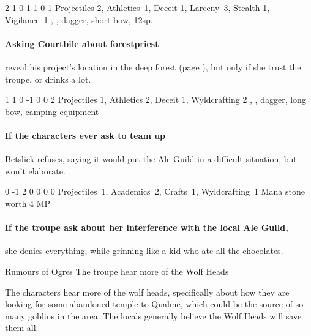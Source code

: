 {2}%
{1}%
{{0}%
{1}%
{1}}%
{0}%
{1}%
{Projectiles 2, Athletics~1, Deceit 1, Larceny~3, Stealth 1, Vigilance~1\knacks{\snapshot, \laststand}}%
{\shortsword, \partialleather, dagger, short bow, 12sp.}%
{\addtocounter{fp}{5}}
\label{courtbile}

\paragraph{Asking Courtbile about \gls{forestpriest}}
reveal his project's location in the deep forest (page \pageref{lostcity}), but only if she trust the troupe, or drinks a lot.

{1}%
{1}%
{{0}%
{-1}%
{0}}%
{0}%
{2}%
{Projectiles 1, Athletics 2, Deceit 1, Wyldcrafting 2\knacks{\adrenalinesurge, \unstoppable, \charge}}%
{\greatsword, \partialchain, dagger, long bow, camping equipment}%
{}

\paragraph{If the characters ever ask to team up}
Betslick refuses, saying it would put the Ale Guild in a difficult situation, but won't elaborate.

{0}%
{-1}%
{{2}%
{0}%
{0}}%
{0}%
{0}%
{Projectiles~1, Academics~2, Crafts~1, Wyldcrafting~1}%
{Mana stone worth 4 MP}%
{
  \knacks{\snapcaster}
  \setcounter{Fire}{2}
  \setcounter{Air}{2}
}

\beardedalemaster
\label{beardedalemaster}

\paragraph{If the troupe ask about her interference with the local Ale Guild,}
she denies everything, while grinning like a kid who ate all the chocolates.

{\N \squash Rumours of Ogres}%
{The troupe hear more of the Wolf Heads}%

The characters hear more of the wolf heads, specifically about how they are looking for some abandoned temple to Qualm\"e, which could be the source of so many goblins in the area.
The locals generally believe the Wolf Heads will save them all.

